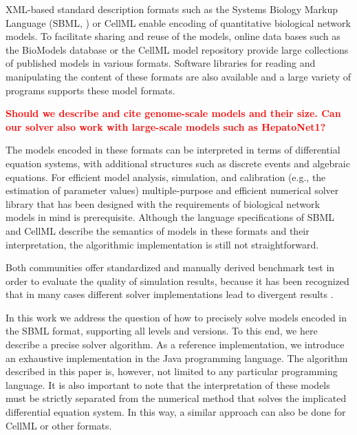\documentclass[10pt]{bmc_article}
\newenvironment{bmcformat}{\baselineskip20pt\sloppy\setboolean{publ}{false}}{\baselineskip20pt\sloppy}
\newcommand{\TODO}[1]{\textcolor{red}{\textbf{#1}}}
\begin{document}
\begin{bmcformat}
XML-based standard description formats \cite{Bray2000} such as the Systems
Biology Markup Language (SBML, \cite{Hucka2004}) or CellML \cite{Lloyd2004}
enable encoding of quantitative biological network models.
To facilitate sharing and reuse of the models, online data bases such as the
BioModels database \cite{Novere2006a} or the CellML model repository
\cite{Lloyd2008} provide large collections of published models in various
formats.
Software libraries for reading and manipulating the content
of these formats are also available \cite{Bornstein2008, Miller2010,
Draeger2011b} and a large variety of programs supports these model formats.

\TODO{Should we describe and cite genome-scale models and their size. Can our solver also
work with large-scale models such as HepatoNet1?}

The models encoded in these formats can be interpreted in terms of differential
equation systems, with additional structures such as discrete events and
algebraic equations. 
For efficient model analysis, simulation, and calibration (e.g.,
the estimation of parameter values) multiple-purpose and efficient numerical
solver library that has been designed with the requirements of biological
network models in mind is prerequisite.
Although the language specifications of SBML \cite{Hucka2001, Hucka2003,
Finney2003a, Finney2006, Hucka2007, Hucka2008, Hucka2010a} 
and CellML \cite{Cuellar2006} describe the semantics of models in these formats
and their interpretation, the algorithmic implementation is still not
straightforward.

Both communities offer standardized and manually derived benchmark test in order
to evaluate the quality of simulation results, because it has been recognized that in many cases
different solver implementations lead to divergent results \cite{Bergmann2008}.

In this work we address the question of how to precisely solve models encoded in
the SBML format, supporting all levels and versions. To this end, we here
describe a precise solver algorithm. As a reference implementation, we
introduce an exhaustive implementation in the Java\texttrademark{} programming
language. The algorithm described in this paper is, however, not limited to any
particular programming language. It is also important to note that the
interpretation of these models must be strictly separated from the numerical
method that solves the implicated differential equation system. In this way, a
similar approach can also be done for CellML or other formats.


\end{bmcformat}
\end{document}
